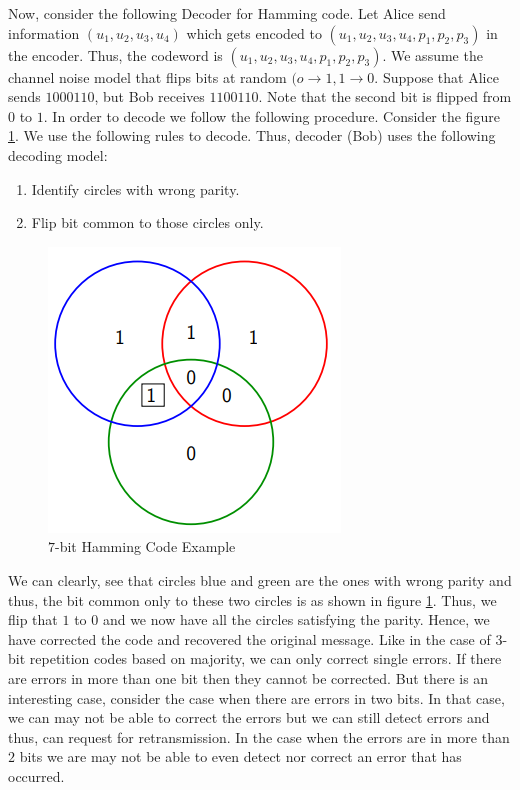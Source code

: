 \documentclass[12pt, oneside]{book}
\theoremstyle{definition}
\theoremstyle{definition}
\theoremstyle{remark}
\begin{document}
Now, consider the following Decoder for Hamming code. Let Alice send information $(u_1,u_2,u_3,u_4)$ which gets encoded to $(u_1,u_2,u_3,u_4,p_1,p_2,p_3)$ in the encoder. Thus, the codeword is $(u_1,u_2,u_3,u_4,p_1,p_2,p_3)$. We assume the channel noise model that flips bits at random $(o\rightarrow 1 , 1\rightarrow 0$. Suppose that Alice sends $1000110$, but Bob receives $1100110$. Note that the second bit is flipped from $0$ to $1$. In order to decode we follow the following procedure. Consider the figure \ref{fig:7bithamcodeexa}. We use the following rules to decode. Thus, decoder (Bob) uses the following decoding model:
\begin{enumerate}
    \item Identify circles with wrong parity.
    \item Flip bit common to those circles only.
\end{enumerate}
\begin{figure}
    \centering
    \includegraphics[width=0.5\linewidth]{Images/7bithamcodeex.png}
    \caption{$7$-bit Hamming Code Example}
    \label{fig:7bithamcodeexa}
\end{figure}
We can clearly, see that circles blue and green are the ones with wrong parity and thus, the bit common only to these two circles is as shown in figure \ref{fig:7bithamcodeexa}. Thus, we flip that $1$ to $0$ and we now have all the circles satisfying the parity. Hence, we have corrected the code and recovered the original message. Like in the case of $3$-bit repetition codes based on majority, we can only correct single errors. If there are errors in more than one bit then they cannot be corrected. But there is an interesting case, consider the case when there are errors in two bits. In that case, we can may not be able to correct the errors but we can still detect errors and thus, can request for retransmission. In the case when the errors are in more than $2$ bits we are may not be able to even detect nor correct an error that has occurred.
\end{document}
